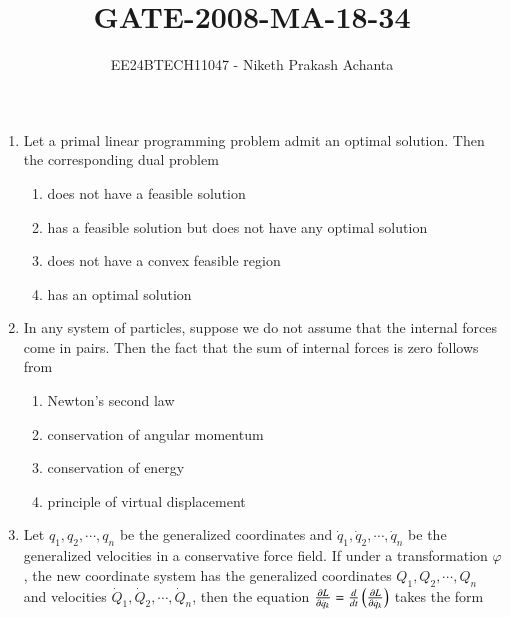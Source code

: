 \documentclass[journal]{IEEEtran}
\renewcommand{\thefigure}{\theenumi}
\renewcommand{\thetable}{\theenumi}
\numberwithin{equation}{enumi}
\numberwithin{figure}{enumi}
\renewcommand{\thetable}{\theenumi}
\begin{document}

\vspace{3cm}

\title{GATE-2008-MA-18-34}
\author{EE24BTECH11047 - Niketh Prakash Achanta}
{\let\newpage\relax\maketitle}
\renewcommand{\thefigure}{\theenumi}
\renewcommand{\thetable}{\theenumi}
\begin{enumerate}[start=18]
\item Let a primal linear programming problem admit an optimal solution. Then the corresponding dual problem
    \begin{enumerate}
        \item does not have a feasible solution
        \item has a feasible solution but does not have any optimal solution
        \item does not have a convex feasible region
        \item has an optimal solution
    \end{enumerate}
\item In any system of particles, suppose we do not assume that the internal forces come in pairs. Then the fact that the sum of internal forces is zero follows from
    \begin{enumerate}
        \item Newton's second law
        \item conservation of angular momentum
        \item conservation of energy
        \item principle of virtual displacement
    \end{enumerate}
\item Let $q_1, q_2, \cdots, q_n$ be the generalized coordinates and $\dot{q}_1, \dot{q}_2, \cdots, \dot{q}_n$ be the generalized velocities in a conservative force field. If under a transformation $\varphi$, the new coordinate system has the generalized coordinates $Q_1, Q_2, \cdots, Q_n$ and velocities $\dot{Q}_1, \dot{Q}_2, \cdots, \dot{Q}_n$, then the equation $\frac{\partial L}{\partial \dot{q}_k} = \frac{d}{dt} \left(\frac{\partial L}{\partial \dot{q}_k}\right)$
takes the form
    \begin{enumerate}

\end{enumerate}
\end{enumerate}
\end{document}
